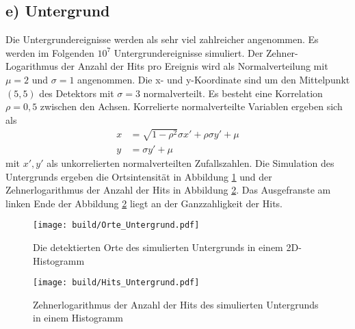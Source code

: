 \subsection*{e) Untergrund}
Die Untergrundereignisse werden als sehr viel zahlreicher angenommen. Es werden im Folgenden $10^7$ Untergrundereignisse simuliert.
Der Zehner-Logarithmus der Anzahl der Hits pro Ereignis wird als Normalverteilung mit $\mu=2$ und $\sigma=1$ angenommen.
Die x- und y-Koordinate sind um den Mittelpunkt $(5,5)$ des Detektors mit $\sigma=3$ normalverteilt. Es besteht eine Korrelation $\rho=0,5$ zwischen den Achsen.
Korrelierte normalverteilte Variablen ergeben sich als
\begin{align}
    x&=\sqrt{1-\rho^2}\sigma x'+\rho\sigma y'+\mu\\
    y&=\sigma y'+\mu
\end{align}
mit $x',y'$ als unkorrelierten normalverteilten Zufallszahlen.
Die Simulation des Untergrunds ergeben die Ortsintensität in Abbildung \ref{fig:Orte_Untergrund} und der Zehnerlogarithmus der Anzahl der Hits in Abbildung \ref{fig:Hits_Untergrund}.
Das Ausgefranste am linken Ende der Abbildung \ref{fig:Hits_Untergrund} liegt an der Ganzzahligkeit der Hits.
\begin{figure}
    \centering
    \texttt{[image: build/Orte\_Untergrund.pdf]}
    \caption{Die detektierten Orte des simulierten Untergrunds in einem 2D-Histogramm}
    \label{fig:Orte_Untergrund}
\end{figure}
\begin{figure}
    \centering
    \texttt{[image: build/Hits\_Untergrund.pdf]}
    \caption{Zehnerlogarithmus der Anzahl der Hits des simulierten Untergrunds in einem Histogramm}
    \label{fig:Hits_Untergrund}
\end{figure}
